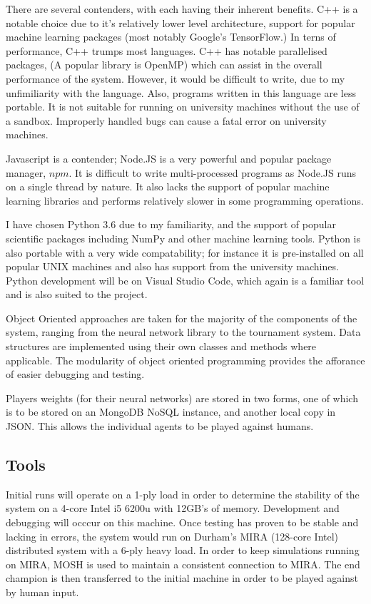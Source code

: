 \documentclass[12pt,a4paper]{article}
\begin{document}
    There are several contenders, with each having their inherent benefits. C++ is a notable choice due to it's relatively lower level architecture, support for popular machine learning packages (most notably Google's TensorFlow.) In terns of performance, C++ trumps most languages. C++ has notable parallelised packages, (A popular library is OpenMP) which can assist in the overall performance of the system. However, it would be difficult to write, due to my unfimiliarity with the language. Also, programs written in this language are less portable. It is not suitable for running on university machines without the use of a sandbox. Improperly handled bugs can cause a fatal error on university machines.

    Javascript is a contender; Node.JS is a very powerful and popular package manager, $npm$. It is difficult to write multi-processed programs as Node.JS runs on a single thread by nature. It also lacks the support of popular machine learning libraries and performs relatively slower in some programming operations.

    I have chosen Python 3.6 due to my familiarity, and the support of popular scientific packages including NumPy and other machine learning tools. Python is also portable with a very wide compatability; for instance it is pre-installed on all popular UNIX machines and also has support from the university machines. Python development will be on Visual Studio Code, which again is a familiar tool and is also suited to the project.

    Object Oriented approaches are taken for the majority of the components of the system, ranging from the neural network library to the tournament system. Data structures are implemented using their own classes and methods where applicable. The modularity of object oriented programming provides the afforance of easier debugging and testing.

    Players weights (for their neural networks) are stored in two forms, one of which is to be stored on an MongoDB NoSQL instance, and another local copy in JSON. This allows the individual agents to be played against humans.

\subsection*{Tools}

    Initial runs will operate on a 1-ply load in order to determine the stability of the system on a 4-core Intel i5 6200u with 12GB's of memory. Development and debugging will occcur on this machine. Once testing has proven to be stable and lacking in errors, the system would run on Durham's MIRA (128-core Intel) distributed system with a 6-ply heavy load. In order to keep simulations running on MIRA, MOSH is used to maintain a consistent  connection to MIRA. The end champion is then transferred to the initial machine in order to be played against by human input.
\end{document}

